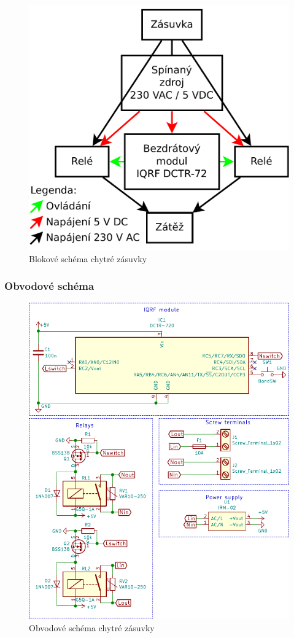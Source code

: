 \documentclass[12pt,a4paper,oneside]{article}
\begin{document}
\begin{figure}[H]
\label{fig:blokove-schema-zasuvky}
\minipage{\textwidth}
\includegraphics[width = 128mm]{img/blokove-schema-zasuvky.pdf}
\caption{Blokové schéma chytré zásuvky}
\endminipage
\end{figure}

\subsubsection{Obvodové schéma}

\begin{figure}[H]
\label{fig:schematic}
\minipage{\textwidth}
\includegraphics[width = 128mm]{img/schematic.pdf}
\caption{Obvodové schéma chytré zásuvky}
\endminipage
\end{figure}
\end{document}
